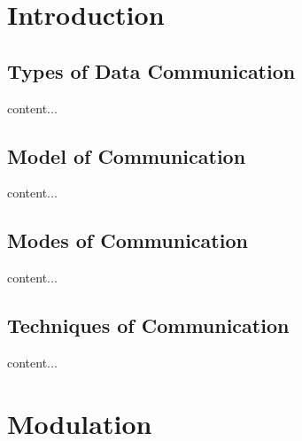 \documentclass[12pt,a4paper]{article}%
\begin{document}
	\pagebreak
	\tableofcontents
	\cleardoublepage
	\section{Introduction}\label{sec:intro}
	\begin{flushleft}
		\subsection{Types of Data Communication}
		\begin{flushleft}
			content...
		\end{flushleft}
		\subsection{Model of Communication}
		\begin{flushleft}
			content...
		\end{flushleft}
		\subsection{Modes of Communication}
		\begin{flushleft}
			content...
		\end{flushleft}
		\subsection{Techniques of Communication}
		\begin{flushleft}
			content...
		\end{flushleft}
	\end{flushleft}
	\pagebreak
	\section{Modulation}
	
\end{document}
